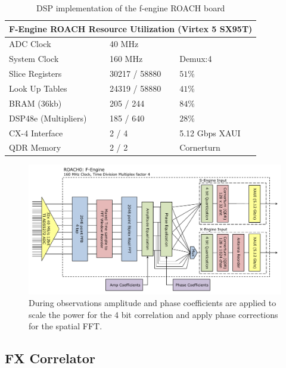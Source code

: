 \documentclass[useAMS,macros,usenatbib,onecolumn]{mn2e}
\begin{document}
\begin{table}
\begin{center}
\begin{tabular}{| l | l | l |}
\hline
\multicolumn{3}{|c|}{F-Engine ROACH Resource Utilization (Virtex 5 SX95T)}\\
\hline
ADC Clock 		& 40 MHz \\
System Clock 		& 160 MHz 	& Demux:4 \\
Slice Registers 	& 30217 / 58880 & $51\%$\\
Look Up Tables 		& 24319 / 58880 & $41\%$\\
BRAM (36kb) 		& 205 / 244 	& $84\%$\\
DSP48e (Multipliers) 	& 185 / 640 	& $28\%$\\
CX-4 Interface 		& 2 / 4 	& 5.12 Gbps XAUI\\
QDR Memory 		& 2 / 2 	& Cornerturn\\
\hline
\end{tabular}
\caption{DSP implementation of the f-engine ROACH board}
\label{tbl:feng_resource}
\end{center}
\end{table}

\begin{figure}
    \centering
    \includegraphics[scale=0.6]{graphics/crop_fengine_block.pdf}
    \caption{During observations amplitude and phase coefficients are applied to scale the power for the 4 bit correlation and apply phase corrections for the spatial FFT.}
    \label{fig:feng_block}
\end{figure}

\subsection{FX Correlator}
\label{correlator}
\end{document}
